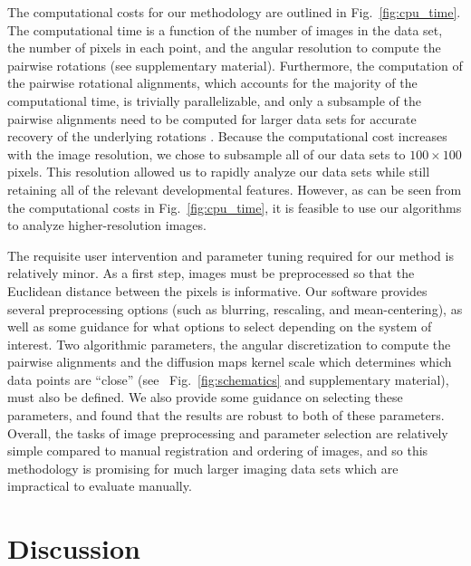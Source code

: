 \documentclass[twocolumn, 10pt]{article}
\newcommand{\SI}[0]{supplementary material}
\newcommand{\fig}[0]{Fig.}
\begin{document}
%
%
The computational costs for our methodology are outlined in \fig~\ref{fig:cpu_time}.
%
The computational time is a function of the number of images in the data set, the number of pixels in each point, and the angular resolution to compute the pairwise rotations (see \SI).
%
Furthermore, the computation of the pairwise rotational alignments, which accounts for the majority of the computational time, is trivially parallelizable, and only a subsample of the pairwise alignments need to be computed for larger data sets for accurate recovery of the underlying rotations \citep{singer2011angular}.
%
Because the computational cost increases with the image resolution, we chose to subsample all of our data sets to $100 \times 100$ pixels.
%
This resolution allowed us to rapidly analyze our data sets while still retaining all of the relevant developmental features.
%
However, as can be seen from the computational costs in \fig~\ref{fig:cpu_time}, it is feasible to use our algorithms to analyze higher-resolution images.

The requisite user intervention and parameter tuning required for our method is relatively minor.
%
As a first step, images must be preprocessed so that the Euclidean distance between the pixels is informative.
%
Our software provides several preprocessing options (such as blurring, rescaling, and mean-centering), as well as some guidance for what options to select depending on the system of interest.
%
Two algorithmic parameters, the angular discretization to compute the pairwise alignments and the diffusion maps kernel scale which determines which data points are ``close'' (see ~\fig~\ref{fig:schematics} and \SI), must also be defined.
%
We also provide some guidance on selecting these parameters, and found that the results are robust to both of these parameters.
%
Overall, the tasks of image preprocessing and parameter selection are relatively simple compared to manual registration and ordering of images, and so this methodology is promising for much larger imaging data sets which are impractical to evaluate manually.



\section*{Discussion}
\end{document}
